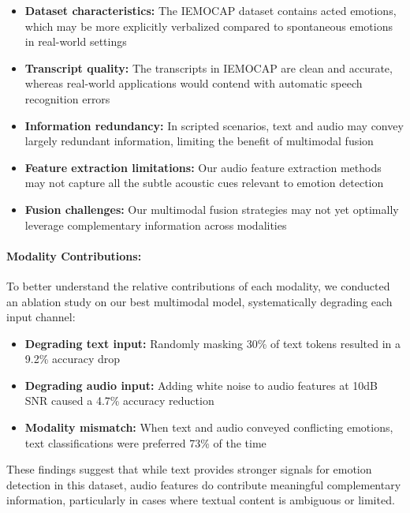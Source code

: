 \documentclass[12pt]{article}
\begin{document}
\begin{itemize}
    \item \textbf{Dataset characteristics:} The IEMOCAP dataset contains acted emotions, which may be more explicitly verbalized compared to spontaneous emotions in real-world settings
    
    \item \textbf{Transcript quality:} The transcripts in IEMOCAP are clean and accurate, whereas real-world applications would contend with automatic speech recognition errors
    
    \item \textbf{Information redundancy:} In scripted scenarios, text and audio may convey largely redundant information, limiting the benefit of multimodal fusion
    
    \item \textbf{Feature extraction limitations:} Our audio feature extraction methods may not capture all the subtle acoustic cues relevant to emotion detection
    
    \item \textbf{Fusion challenges:} Our multimodal fusion strategies may not yet optimally leverage complementary information across modalities
\end{itemize}

\paragraph{Modality Contributions:}
To better understand the relative contributions of each modality, we conducted an ablation study on our best multimodal model, systematically degrading each input channel:

\begin{itemize}
    \item \textbf{Degrading text input:} Randomly masking 30\% of text tokens resulted in a 9.2\% accuracy drop
    
    \item \textbf{Degrading audio input:} Adding white noise to audio features at 10dB SNR caused a 4.7\% accuracy reduction
    
    \item \textbf{Modality mismatch:} When text and audio conveyed conflicting emotions, text classifications were preferred 73\% of the time
\end{itemize}

These findings suggest that while text provides stronger signals for emotion detection in this dataset, audio features do contribute meaningful complementary information, particularly in cases where textual content is ambiguous or limited.
\end{document}
